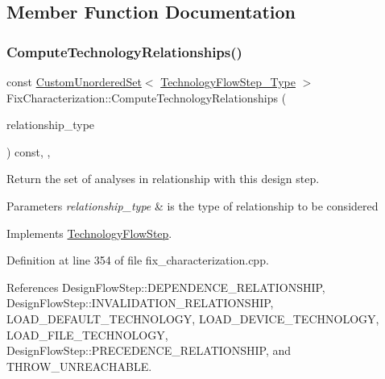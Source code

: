 \subsection{Member Function Documentation}
\mbox{\label{classFixCharacterization_a01b2fe97c0c10544d6dbc2671eedd35a}} 
\subsubsection{\texorpdfstring{Compute\+Technology\+Relationships()}{ComputeTechnologyRelationships()}}
{\footnotesize\ttfamily const \hyperlink{classCustomUnorderedSet}{Custom\+Unordered\+Set}$<$ \hyperlink{technology__flow__step_8hpp_a65208cfec963a7d7def292f9db428292}{Technology\+Flow\+Step\+\_\+\+Type} $>$ Fix\+Characterization\+::\+Compute\+Technology\+Relationships (\begin{DoxyParamCaption}\item[{const \hyperlink{classDesignFlowStep_a723a3baf19ff2ceb77bc13e099d0b1b7}{Design\+Flow\+Step\+::\+Relationship\+Type}}]{relationship\+\_\+type }\end{DoxyParamCaption}) const\hspace{0.3cm}{\ttfamily [override]}, {\ttfamily [protected]}, {\ttfamily [virtual]}}



Return the set of analyses in relationship with this design step. 


\begin{DoxyParams}{Parameters}
{\em relationship\+\_\+type} & is the type of relationship to be considered \\
\hline
\end{DoxyParams}


Implements \hyperlink{classTechnologyFlowStep_ab543169c9b0143c8ae8831d765519075}{Technology\+Flow\+Step}.



Definition at line 354 of file fix\+\_\+characterization.\+cpp.



References Design\+Flow\+Step\+::\+D\+E\+P\+E\+N\+D\+E\+N\+C\+E\+\_\+\+R\+E\+L\+A\+T\+I\+O\+N\+S\+H\+IP, Design\+Flow\+Step\+::\+I\+N\+V\+A\+L\+I\+D\+A\+T\+I\+O\+N\+\_\+\+R\+E\+L\+A\+T\+I\+O\+N\+S\+H\+IP, L\+O\+A\+D\+\_\+\+D\+E\+F\+A\+U\+L\+T\+\_\+\+T\+E\+C\+H\+N\+O\+L\+O\+GY, L\+O\+A\+D\+\_\+\+D\+E\+V\+I\+C\+E\+\_\+\+T\+E\+C\+H\+N\+O\+L\+O\+GY, L\+O\+A\+D\+\_\+\+F\+I\+L\+E\+\_\+\+T\+E\+C\+H\+N\+O\+L\+O\+GY, Design\+Flow\+Step\+::\+P\+R\+E\+C\+E\+D\+E\+N\+C\+E\+\_\+\+R\+E\+L\+A\+T\+I\+O\+N\+S\+H\+IP, and T\+H\+R\+O\+W\+\_\+\+U\+N\+R\+E\+A\+C\+H\+A\+B\+LE.

